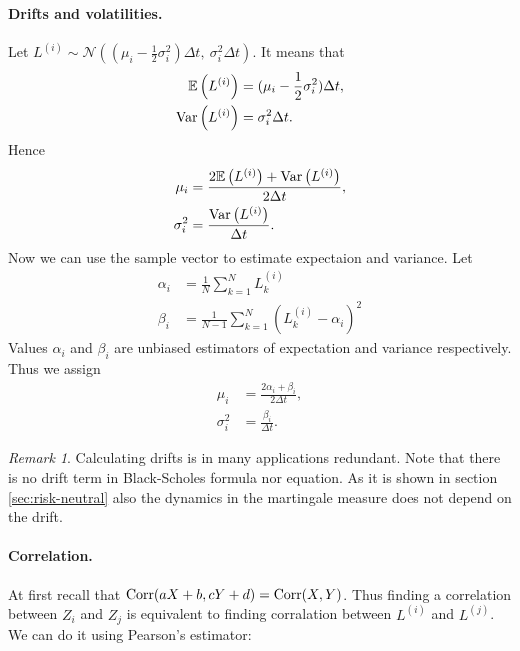 \documentclass[a4paper,11pt, twoside]{book}
\theoremstyle{definition}
\theoremstyle{remark}
\newtheorem{remark}{Remark}[chapter]
\def\Var{{\rm Var}}
\def\E{{\mathbb{E}}}
\def\Corr{{\hbox{Corr}}}
\begin{document}
\paragraph{Drifts and volatilities.}
Let $L^{(i)} \sim \mathcal{N}\left(  (\mu_i - \frac{1}{2}\sigma_i^2)\Delta t,\ \sigma_i^2 \Delta t \right)$. It means that
\begin{equation*}
 \begin{split}
  \E\left( L^{(i)} \right) &= (\mu_i - \frac{1}{2}\sigma_i^2)\Delta t, \\
  \Var\left( L^{(i)} \right) &= \sigma_i^2 \Delta t.
 \end{split}
\end{equation*}
Hence
\begin{equation*}
 \begin{split}
  \mu_i  &= \frac{ 2\E\left( L^{(i)} \right) + \Var\left( L^{(i)} \right) }{2\Delta t}, \\
  \sigma_i^2 &= \frac{\Var\left( L^{(i)} \right)}{\Delta t}.
 \end{split}
\end{equation*}
Now we can use the sample vector to estimate expectaion and variance. Let
\begin{equation*}
 \begin{split}
  \alpha_i &= \frac{1}{N}\sum\limits_{k=1}^{N} L^{(i)}_k\\
  \beta_i &= \frac{1}{N-1}\sum\limits_{k=1}^{N}(L^{(i)}_k - \alpha_i)^2
 \end{split}
\end{equation*}
Values $\alpha_i$ and $\beta_i$ are unbiased estimators of expectation and variance respectively. Thus we assign
\begin{equation*}
 \begin{split}
  \mu_i  &= \frac{ 2\alpha_i + \beta_i }{2\Delta t}, \\
  \sigma_i^2 &= \frac{\beta_i}{\Delta t}.
 \end{split}
\end{equation*}
\begin{remark}
 Calculating drifts is in many applications redundant. Note that there is no drift term in Black-Scholes formula nor equation. As it is shown in section \ref{sec:risk-neutral} also the dynamics in the martingale measure does not depend on the drift.
\end{remark}


\paragraph{Correlation.} At first recall that $\Corr(aX + b, cY + d) = \Corr(X,Y)$. Thus finding a correlation between $Z_i$ and $Z_j$ is equivalent to finding corralation between $L^{(i)}$ and $L^{(j)}$. We can do it using Pearson's estimator:
\end{document}
